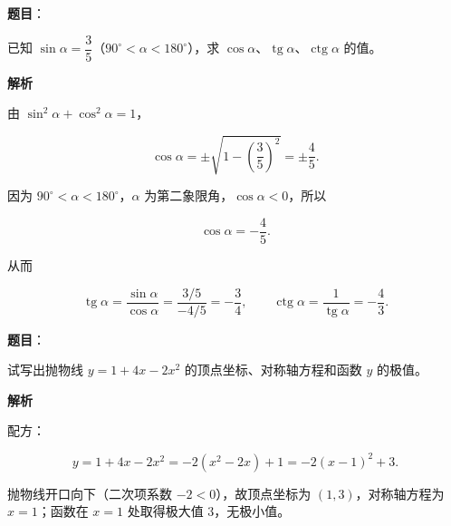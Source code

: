 \begin{answer}

\textbf{题目}：

已知 $\sin\alpha=\dfrac{3}{5}$（$90^\circ<\alpha<180^\circ$），求 $\cos\alpha$、$\operatorname{tg}\alpha$、$\operatorname{ctg}\alpha$ 的值。

\textbf{解析}

由 $\sin^{2}\alpha+\cos^{2}\alpha=1$，

\nopagebreak[4]
\[
\cos\alpha=\pm\sqrt{1-\left(\frac{3}{5}\right)^{2}}=\pm\frac{4}{5}.
\]

因为 $90^\circ<\alpha<180^\circ$，$\alpha$ 为第二象限角，$\cos\alpha<0$，所以

\nopagebreak[4]
\[
\cos\alpha=-\frac{4}{5}.
\]

从而

\nopagebreak[4]
\[
\operatorname{tg}\alpha=\frac{\sin\alpha}{\cos\alpha}
=\frac{3/5}{-4/5}=-\frac{3}{4},
\qquad
\operatorname{ctg}\alpha=\frac{1}{\operatorname{tg}\alpha}=-\frac{4}{3}.
\]


\end{answer}
\begin{answer}

\textbf{题目}：

试写出抛物线 $y=1+4x-2x^{2}$ 的顶点坐标、对称轴方程和函数 $y$ 的极值。

\textbf{解析}

配方：

\nopagebreak[4]
\[
y=1+4x-2x^{2}=-2\left(x^{2}-2x\right)+1=-2(x-1)^{2}+3.
\]

抛物线开口向下（二次项系数 $-2<0$），故顶点坐标为 $(1,3)$，对称轴方程为 $x=1$；函数在 $x=1$ 处取得极大值 $3$，无极小值。


\end{answer}
